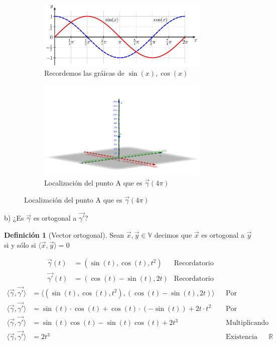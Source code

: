 \documentclass[letterpaper]{article}
\providecommand{\pint}[1]{\langle#1\rangle}
\newcommand{\V}{\mathds{V}}
\newcommand{\R}{\mathds{R}}
\renewcommand{\*}{\cdot}
\theoremstyle{definition}
\newtheorem{definition}{Definición}
\begin{document}
\begin{figure}[h!]
	\centering
	\begin{subfigure}[b]{0.5\linewidth}
		\includegraphics[width=0.9\textwidth]{img/trigo.png}
		\caption{Recordemos las gráicas de $ \sin(x),  \cos(x)$}
	\end{subfigure}
\begin{subfigure}[b]{0.85\linewidth}
	\includegraphics[width=0.9\textwidth]{img/Proyecto4_1.png}
	\caption{Localización del punto A que es $ \vec{\gamma}(4\pi) $}
\end{subfigure}
\end{figure}
\noindent b) ¿Es $\vec{\gamma}$ es ortogonal a  $\vec{\gamma'}$?
\begin{definition}[Vector ortogonal]
	Sean $\vec{x}, \vec{y} \in \V  $ decimos que $ \vec{x} $ es ortogonal a $ \vec{y} $ si y sólo si $ \pint{\vec{x},\vec{y}} = 0 $
\end{definition}
\[\begin{array}{rlc}
\vec{\gamma}(t) &= (\sin(t), \cos(t), t^2)  &\text{Recordatorio}\\
\vec{\gamma'}(t) &= (\cos(t) - \sin(t), 2t) &\text{Recordatorio}
\end{array}
 \]
 \begin{align*}
 	\pint{\vec{\gamma}, \vec{\gamma'}} & = \pint{(\sin(t), \cos(t), t^2), (\cos(t) - \sin(t), 2t)} && \text{Por recordatorio anterior}\\
 	\pint{\vec{\gamma}, \vec{\gamma'}} & = \sin(t)\* \cos(t) + \cos(t)\*(-\sin(t)) + 2t\*t^2 && \text{Por definición de producto escalar}\\
 	\pint{\vec{\gamma}, \vec{\gamma'}} & = \sin(t)\cos(t) -\sin(t)\cos(t) + 2t^3 && \text{Multiplicando términos semejantes}\\
 	\pint{\vec{\gamma}, \vec{\gamma'}} & = 2t^3 && \text{Existencia del inverso aditivo en }\R \\
 \end{align*}
\end{document}
